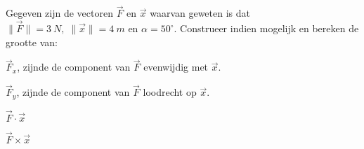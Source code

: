 \documentclass{ximera}
\begin{document}
\begin{exercise}

Gegeven zijn de vectoren \(\vec{F}\) en \(\vec{x}\) waarvan geweten is dat \(\| \vec{F} \| = \SI{3}{N}, \; \|\vec{x}\| = \SI{4}{m} \text{ en } \alpha = 50^\circ \).
Construeer indien mogelijk en bereken de grootte van: 

	\begin{image}[0.2\textwidth]
		\end{image}

\begin{question}
	\(\vec{F}_x\), zijnde de component van \(\vec{F}\) evenwijdig met \(\vec{x}\). 
\end{question}

\begin{question}
	\(\vec{F}_y\), zijnde de component van \(\vec{F}\) loodrecht op \(\vec{x}\). 
\end{question}

\begin{question}
	\(\vec{F} \cdot \vec{x}\)
\end{question}

\begin{question}
	\(\vec{F} \times \vec{x}\)
\end{question}
\end{exercise}
\end{document}
